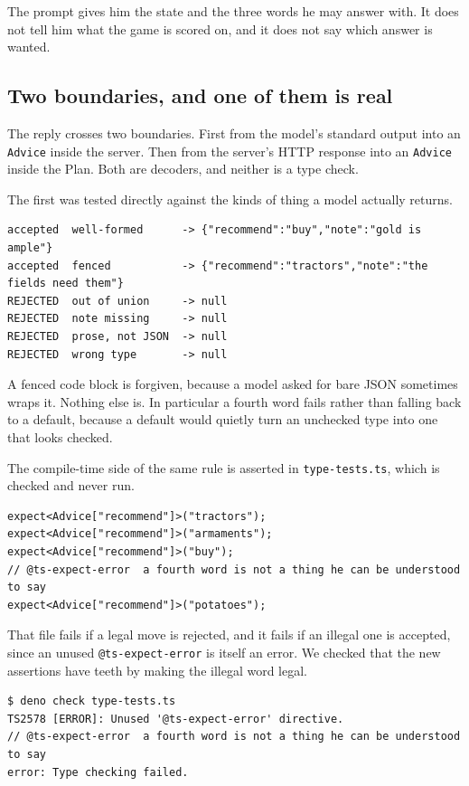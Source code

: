 \documentclass[11pt,a4paper]{article}
\begin{document}
The prompt gives him the state and the three words he may answer with. It does not tell him
what the game is scored on, and it does not say which answer is wanted.

\subsection{Two boundaries, and one of them is real}

The reply crosses two boundaries. First from the model's standard output into an
\texttt{Advice} inside the server. Then from the server's HTTP response into an
\texttt{Advice} inside the Plan. Both are decoders, and neither is a type check.

The first was tested directly against the kinds of thing a model actually returns.

\begin{lstlisting}[language=SH]
accepted  well-formed      -> {"recommend":"buy","note":"gold is ample"}
accepted  fenced           -> {"recommend":"tractors","note":"the fields need them"}
REJECTED  out of union     -> null
REJECTED  note missing     -> null
REJECTED  prose, not JSON  -> null
REJECTED  wrong type       -> null
\end{lstlisting}

A fenced code block is forgiven, because a model asked for bare JSON sometimes wraps it.
Nothing else is. In particular a fourth word fails rather than falling back to a default,
because a default would quietly turn an unchecked type into one that looks checked.

The compile-time side of the same rule is asserted in \texttt{type-tests.ts}, which is checked
and never run.

\begin{lstlisting}[language=TS]
expect<Advice["recommend"]>("tractors");
expect<Advice["recommend"]>("armaments");
expect<Advice["recommend"]>("buy");
// @ts-expect-error  a fourth word is not a thing he can be understood to say
expect<Advice["recommend"]>("potatoes");
\end{lstlisting}

That file fails if a legal move is rejected, and it fails if an illegal one is accepted, since
an unused \texttt{@ts-expect-error} is itself an error. We checked that the new assertions have
teeth by making the illegal word legal.

\begin{lstlisting}[language=SH]
$ deno check type-tests.ts
TS2578 [ERROR]: Unused '@ts-expect-error' directive.
// @ts-expect-error  a fourth word is not a thing he can be understood to say
error: Type checking failed.
\end{lstlisting}
\end{document}
